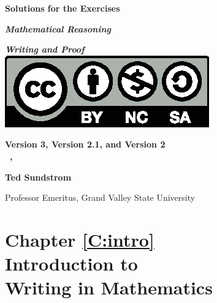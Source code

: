 \documentclass[11pt,openany]{book}
\begin{document}


\begin{titlepage}
\vspace*{0.5in}
\begin{center}
\fontsize{23}{12}\selectfont \textbf{Solutions for the Exercises}

\smallskip
\fontsize{23}{12}\selectfont \textbf{\emph{Mathematical Reasoning}}

\textbf{\huge{\emph{Writing and Proof}}} \\
\vspace{0.3125in}
\includegraphics{CC-by-nc-sa.eps}

\vspace{0.3in}
\textbf{\large{Version 3, Version 2.1, and Version 2}} \\
\textbf{\large{\monthname~\the\day,~~\the\year}}

\vspace{1.0in}
\textbf{\huge{Ted Sundstrom}}



\smallskip
\Large{Professor Emeritus, Grand Valley State University}
\end{center}


\end{titlepage}





\newpage

\mainmatter
%
%
%
%
%
%
%
%
%

\setcounter{page}{3}
\chapter*{Chapter \ref{C:intro}\\Introduction to \\Writing in Mathematics}


\end{document}
